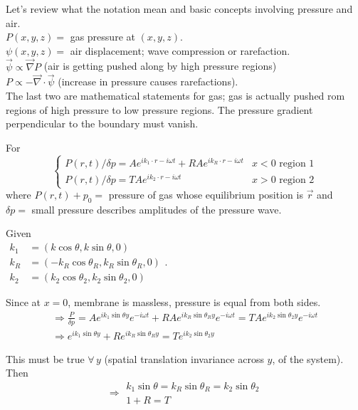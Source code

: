 \documentclass[twoside,10pt]{amsart}
\newcommand{\problemhead}[1]
  {\smallskip
   \noindent{\large\bf Problem #1.}
   \smallskip}
\begin{document}
\problemhead{11.11} Let's review what the notation mean and basic concepts involving pressure and air.  \\
$P(x,y,z) = $ gas pressure at $(x,y,z)$.  \\
$\psi(x,y,z) =$ air displacement; wave compression or rarefaction. \\

$\vec{\psi} \propto \vec{\nabla} P$ (air is getting pushed along by high pressure regions) \\
$P \propto - \vec{ \nabla} \cdot \vec{\psi}$ (increase in pressure causes rarefactions).  \\
The last two are mathematical statements for gas; gas is actually pushed rom regions of high pressure to low pressure regions.  The pressure gradient perpendicular to the boundary must vanish.  

For 
\[
\begin{cases} 
  P(r,t)/\delta p = A e^{i k_1 \cdot r - i \omega t} + RA e^{ ik_R \cdot r - i \omega t} & x < 0 \text{ region 1} \\ 
  P(r,t)/\delta p = T A e^{ i k_2 \cdot r - i\omega t} & x > 0 \text{ region 2}
\end{cases}
\]
where $P(r,t) + p_0 = $ pressure of gas whose equilibrium position is $\vec{r}$ and \\
$\delta p = $ small pressure describes amplitudes of the pressure wave.  

Given \\
$\begin{aligned} k_1 & = (k\cos{\theta}, k\sin{\theta}, 0) \\ k_R & = (-k_R \cos{\theta_R}, k_R \sin{\theta_R} ,0) \\ k_2 & = (k_2 \cos{\theta_2}, k_2 \sin{\theta_2}, 0 ) \end{aligned}$.

Since at $x=0$, membrane is massless, pressure is equal from both sides.  
\[
\begin{gathered}
  \Longrightarrow \frac{P}{ \delta p} = A e^{ i k_1 \sin{\theta} y } e^{-i \omega t} + RA e^{ i k_R \sin{\theta_R} y }e^{ - i \omega t} = TA e^{ i k_2 \sin{\theta_2} y} e^{-i\omega t} \\ 
  \Longrightarrow e^{ i k_1 \sin{\theta} y } + R e^{ i k_R \sin{\theta_R} y } = T e^{ ik_2 \sin{\theta_2}y }
\end{gathered}
\]

This must be true $\forall \, y$ (spatial translation invariance across $y$, of the system).  Then 
\[
\Longrightarrow
\begin{gathered}
  k_1 \sin{\theta} = k_R \sin{\theta_R} = k_2 \sin{\theta_2} \\ 
  1 + R = T 
\end{gathered}
\]
\end{document}
